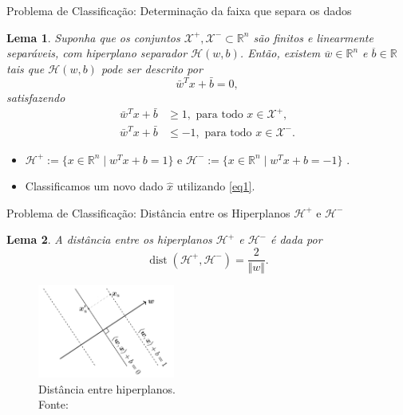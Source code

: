 \documentclass{beamer}
\DeclareMathOperator{\proj}{proj}
\DeclareMathOperator{\dist}{dist}
\def\Xset{\mathcal{X}}
\def\Hset{\mathcal{H}}
\def\RR{\mathds{R}}
\def\xbar{\bar{x}}
\def\wbar{\bar{w}}
\def\bbar{\bar{b}}
\newtheorem{prop}{Proposição}
\newtheorem{lema}{Lema}
\theoremstyle{definition}%
\begin{document}
\begin{frame}{Problema de Classificação: Determinação da faixa que separa os dados}
\begin{lema} \label{lema1} Suponha que os conjuntos $\Xset^{+}, \Xset^{-} \subset \RR^n$ são finitos e linearmente separáveis, com hiperplano separador $\Hset(w,b)$. Então, existem $\overline{w}\in \RR^n$ e $\overline{b}\in \RR$ tais que $\Hset(w,b)$ pode ser descrito por
\[\wbar^{T}x+\bbar =0,\]
satisfazendo
\begin{align}
\wbar^{T}x+\bbar &\geq 1, \text{ para todo } x\in \Xset^{+}, \label{eq1} \\
\wbar^{T}x+\bbar &\leq -1, \text{ para todo } x\in \Xset^{-}. \label{eq2}
\end{align}
\end{lema} 
\pause
\begin{itemize}
	\item $\Hset^{+}:=\{x\in \RR^n \mid w^{T}x+b= 1\}$ e $\Hset^{-}:=\{x\in \RR^n \mid w^{T}x+b= -1\}$ .

	\item Classificamos um novo dado $\hat{x}$ utilizando \eqref{eq1}.
\end{itemize}
\end{frame}




\begin{frame}{Problema de Classificação: Distância entre os Hiperplanos $\Hset^{+}$ e $\Hset^{-}$}

\begin{lema}\label{lema2} A distância entre os hiperplanos $\Hset^{+}$ e $\Hset^{-}$ é dada por \[\dist(\Hset^{+} , \Hset^{-})=\dfrac{2}{\Vert w\Vert}.\]
\end{lema}

\begin{figure}[!h] 
	\centering
	\includegraphics[width=0.40\textwidth]{distancia_hiperplanos}
	\caption{Distância entre hiperplanos. \\ Fonte: \textcite{Faisal2019}}
\end{figure}
\end{frame}
\end{document}
